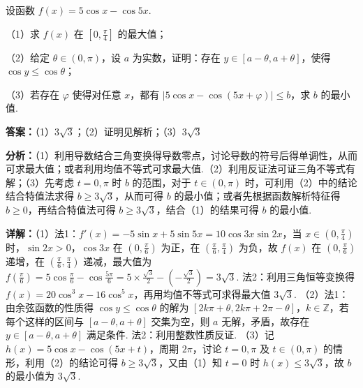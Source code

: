 \begin{question}[points=17]
设函数 $f(x) = 5\cos x - \cos 5x$.



（1）求 $f(x)$ 在 $\left[0, \frac{\pi}{4}\right]$ 的最大值；



（2）给定 $\theta \in (0,\pi)$，设 $a$ 为实数，证明：存在 $y \in [a-\theta, a+\theta]$，使得 $\cos y \le \cos \theta$；



（3）若存在 $\varphi$ 使得对任意 $x$，都有 $|5\cos x - \cos(5x+\varphi)| \le b$，求 $b$ 的最小值.
\begin{solution}
\textbf{答案：}（1）$3\sqrt{3}$；（2）证明见解析；（3）$3\sqrt{3}$

\textbf{分析：}（1）利用导数结合三角变换得导数零点，讨论导数的符号后得单调性，从而可求最大值；或者利用均值不等式可求最大值.（2）利用反证法可证三角不等式有解；（3）先考虑 $t=0,\pi$ 时 $b$ 的范围，对于 $t \in (0,\pi)$ 时，可利用（2）中的结论结合特值法求得 $b \ge 3\sqrt{3}$，从而可得 $b$ 的最小值；或者先根据函数解析特征得 $b \ge 0$，再结合特值法可得 $b \ge 3\sqrt{3}$，结合（1）的结果可得 $b$ 的最小值.

\textbf{详解：}（1）法1：$f'(x) = -5\sin x + 5\sin 5x = 10\cos 3x \sin 2x$，当 $x \in (0,\frac{\pi}{4})$ 时，$\sin 2x > 0$，$\cos 3x$ 在 $(0,\frac{\pi}{6})$ 为正，在 $(\frac{\pi}{6},\frac{\pi}{4})$ 为负，故 $f(x)$ 在 $(0,\frac{\pi}{6})$ 递增，在 $(\frac{\pi}{6},\frac{\pi}{4})$ 递减，最大值为 $f(\frac{\pi}{6}) = 5\cos\frac{\pi}{6} - \cos\frac{5\pi}{6} = 5\times\frac{\sqrt{3}}{2} - (-\frac{\sqrt{3}}{2}) = 3\sqrt{3}$. 法2：利用三角恒等变换得 $f(x)=20\cos^3 x - 16\cos^5 x$，再用均值不等式可求得最大值 $3\sqrt{3}$.
（2）法1：由余弦函数的性质得 $\cos y \le \cos\theta$ 的解为 $[2k\pi+\theta, 2k\pi+2\pi-\theta]$，$k \in \mathbb{Z}$，若每个这样的区间与 $[a-\theta, a+\theta]$ 交集为空，则 $a$ 无解，矛盾，故存在 $y \in [a-\theta, a+\theta]$ 满足条件. 法2：利用整数性质反证.
（3）记 $h(x)=5\cos x - \cos(5x+t)$，周期 $2\pi$，讨论 $t=0,\pi$ 及 $t \in (0,\pi)$ 的情形，利用（2）的结论可得 $b \ge 3\sqrt{3}$，又由（1）知 $t=0$ 时 $h(x) \le 3\sqrt{3}$，故 $b$ 的最小值为 $3\sqrt{3}$.
\end{solution}
\end{question}

